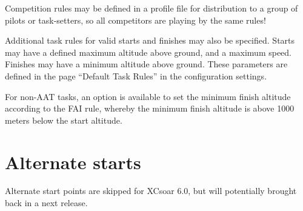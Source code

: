 \tip Competition rules may be defined in a profile file for
distribution to a group of pilots or task-setters, so all competitors
are playing by the same rules!

Additional task rules for valid starts and finishes may also be
specified.  Starts may have a defined maximum altitude above ground,
and a maximum speed.  Finishes may have a minimum altitude above
ground.  These parameters are defined in the page ``Default Task Rules'' in
the configuration  settings.

For non-AAT tasks, an option is available to set the minimum finish
altitude according to the FAI rule, whereby the minimum finish
altitude is above 1000 meters below the start altitude.

\section{Alternate starts}\label{sec:alternate-starts}

Alternate start points are skipped for XCsoar 6.0, but
will potentially brought back in a next release. 


  

  



